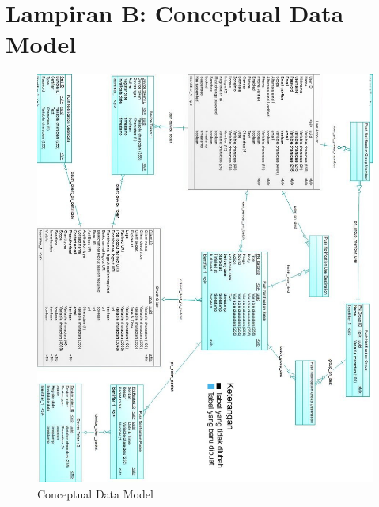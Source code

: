 \chapter{Lampiran B: Conceptual Data Model} \label{lampiran:cdm}
\begin{figure}[H]
	\centering\includegraphics[height=0.82\textheight]{penutup/lampiran/b/CDM_mix.jpg}
	\caption{Conceptual Data Model}
\end{figure}

